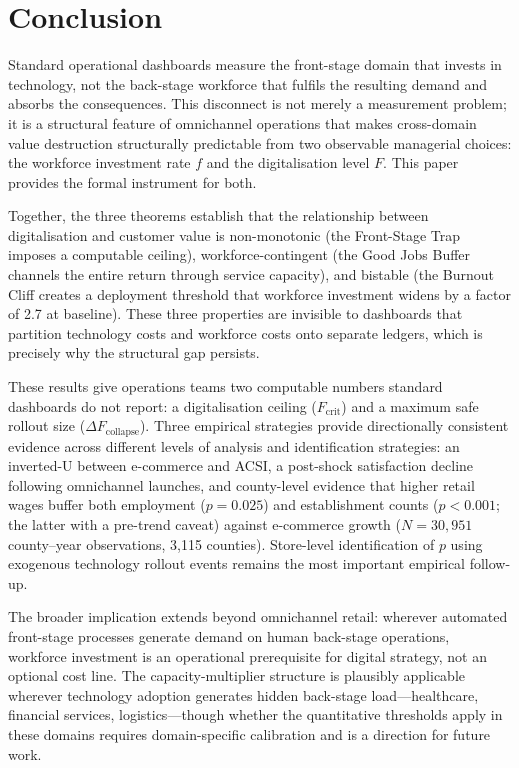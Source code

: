 \documentclass[msom,dblanonrev]{informs4}
\begin{document}
\section{Conclusion}\label{sec:conclusion}

Standard operational dashboards measure the front-stage domain that invests in technology, not the back-stage workforce that fulfils the resulting demand and absorbs the consequences. This disconnect is not merely a measurement problem; it is a structural feature of omnichannel operations that makes cross-domain value destruction structurally predictable from two observable managerial choices: the workforce investment rate $f$ and the digitalisation level $F$. This paper provides the formal instrument for both.

Together, the three theorems establish that the relationship between digitalisation and customer value is non-monotonic (the Front-Stage Trap imposes a computable ceiling), workforce-contingent (the Good Jobs Buffer channels the entire return through service capacity), and bistable (the Burnout Cliff creates a deployment threshold that workforce investment widens by a factor of 2.7 at baseline). These three properties are invisible to dashboards that partition technology costs and workforce costs onto separate ledgers, which is precisely why the structural gap persists.

These results give operations teams two computable numbers standard dashboards do not report: a digitalisation ceiling ($F_{\mathrm{crit}}$) and a maximum safe rollout size ($\Delta F_{\mathrm{collapse}}$). Three empirical strategies provide directionally consistent evidence across different levels of analysis and identification strategies: an inverted-U between e-commerce and ACSI, a post-shock satisfaction decline following omnichannel launches, and county-level evidence that higher retail wages buffer both employment ($p = 0.025$) and establishment counts ($p < 0.001$; the latter with a pre-trend caveat) against e-commerce growth ($N = 30{,}951$ county--year observations, 3{,}115 counties). Store-level identification of $p$ using exogenous technology rollout events remains the most important empirical follow-up.

The broader implication extends beyond omnichannel retail: wherever automated front-stage processes generate demand on human back-stage operations, workforce investment is an operational prerequisite for digital strategy, not an optional cost line. The capacity-multiplier structure is plausibly applicable wherever technology adoption generates hidden back-stage load---healthcare, financial services, logistics---though whether the quantitative thresholds apply in these domains requires domain-specific calibration and is a direction for future work.
\end{document}
